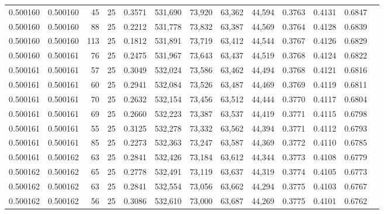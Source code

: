 \begin{tabular}{rrrrrrrrrrrrr}
0.500160 & 0.500160 &    45 &  25 &                                     0.3571 & 531,690 &  73,920 &  63,362 &  44,594 & 0.3763 & 0.4131 & 0.6847 \\
0.500160 & 0.500160 &    88 &  25 &                                     0.2212 & 531,778 &  73,832 &  63,387 &  44,569 & 0.3764 & 0.4128 & 0.6839 \\
0.500160 & 0.500160 &   113 &  25 &                                     0.1812 & 531,891 &  73,719 &  63,412 &  44,544 & 0.3767 & 0.4126 & 0.6829 \\
0.500160 & 0.500161 &    76 &  25 &                                     0.2475 & 531,967 &  73,643 &  63,437 &  44,519 & 0.3768 & 0.4124 & 0.6822 \\
0.500161 & 0.500161 &    57 &  25 &                                     0.3049 & 532,024 &  73,586 &  63,462 &  44,494 & 0.3768 & 0.4121 & 0.6816 \\
0.500161 & 0.500161 &    60 &  25 &                                     0.2941 & 532,084 &  73,526 &  63,487 &  44,469 & 0.3769 & 0.4119 & 0.6811 \\
0.500161 & 0.500161 &    70 &  25 &                                     0.2632 & 532,154 &  73,456 &  63,512 &  44,444 & 0.3770 & 0.4117 & 0.6804 \\
0.500161 & 0.500161 &    69 &  25 &                                     0.2660 & 532,223 &  73,387 &  63,537 &  44,419 & 0.3771 & 0.4115 & 0.6798 \\
0.500161 & 0.500161 &    55 &  25 &                                     0.3125 & 532,278 &  73,332 &  63,562 &  44,394 & 0.3771 & 0.4112 & 0.6793 \\
0.500161 & 0.500161 &    85 &  25 &                                     0.2273 & 532,363 &  73,247 &  63,587 &  44,369 & 0.3772 & 0.4110 & 0.6785 \\
0.500161 & 0.500162 &    63 &  25 &                                     0.2841 & 532,426 &  73,184 &  63,612 &  44,344 & 0.3773 & 0.4108 & 0.6779 \\
0.500162 & 0.500162 &    65 &  25 &                                     0.2778 & 532,491 &  73,119 &  63,637 &  44,319 & 0.3774 & 0.4105 & 0.6773 \\
0.500162 & 0.500162 &    63 &  25 &                                     0.2841 & 532,554 &  73,056 &  63,662 &  44,294 & 0.3775 & 0.4103 & 0.6767 \\
0.500162 & 0.500162 &    56 &  25 &                                     0.3086 & 532,610 &  73,000 &  63,687 &  44,269 & 0.3775 & 0.4101 & 0.6762 \\

\end{tabular}

